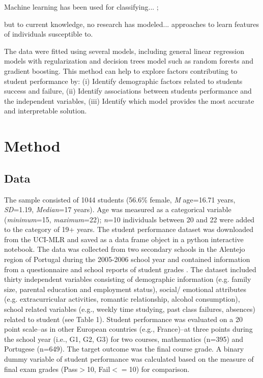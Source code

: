 \documentclass[sigconf]{acmart}
\begin{document}
Machine learning has been used for classifying...
\cite{zhang05, pariyadath14}; 

but to current knowledge, no research has modeled... 
approaches to learn features of  individuals susceptible to. 

The data were fitted using several models, including general linear 
regression models with regularization and decision trees model such as
random forests and gradient boosting. This method can help to explore
factors contributing to student performance by: (i) Identify demographic 
factors related to students success and failure, (ii) Identify associations 
between students performance and the independent variables, (iii) Identify 
which model provides the most accurate and interpretable solution. 


\section{Method}

\subsection{Data}

The sample consisted of 1044 students (56.6\% female, \textit{M} age=16.71 
years, \textit{SD}=1.19, \textit{Median}=17 years). Age was measured as 
a categorical variable (\textit{minimum}=15, \textit{maximum}=22); 
\textit{n}=10 individuals between 20 and 22 were added to the category of 
19+ years. The student performance dataset was downloaded from the UCI-MLR 
and saved as a data frame object in a python interactive notebook. The data 
was collected from two secondary schools in the Alentejo region of Portugal 
during the 2005-2006 school year and contained information from a 
questionnaire and school reports of student grades \cite{cortez09}. 
The dataset included thirty independent variables consisting of demographic 
information (e.g. family size, parental education and employment status), 
social/ emotional attributes (e.g. extracurricular activities, romantic
relationship, alcohol consumption), school related variables (e.g., weekly 
time studying, past class failures, absences) related to student
(see Table 1). Student performance was evaluated on a 20 point scale--as in 
other European countries (e.g., France)--at three points during the school 
year (i.e., G1, G2, G3) for two courses, mathematics (n=395) and Portugese 
(n=649). The target outcome was the final course grade. A binary dummy
variable of student performance was calculated based on the measure of 
final exam grades (Pass$>$10, Fail$<=$10) for comparison.
\end{document}
